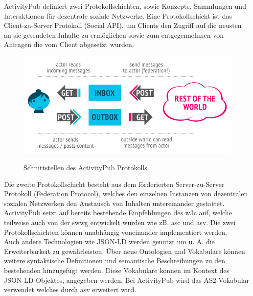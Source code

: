 {	ActivityPub definiert zwei Protokollschichten, sowie Konzepte, Sammlungen und Interaktionen für dezentrale soziale Netzwerke. Eine Protokollschicht ist das Client-zu-Server Protokoll (Social API), um Clients den Zugriff auf die neusten an sie gesendeten Inhalte zu ermöglichen sowie zum entgegennehmen von Anfragen die vom Client abgesetzt wurden\cite{activityPub}.\\ 
	
	\begin{figure}[h]
		\begin{minipage}{\textwidth}
			\centering
			\includegraphics[scale=0.55]{figures/client-server-federated.png}
			\label{fig:client-server-federated}
			\caption{Schnittstellen des ActivityPub Protokolls}
		\end{minipage}
	\end{figure}
	
	Die zweite Protokollschicht besteht aus dem förderierten Server-zu-Server Protokoll (Federation Protocol), welches den einzelnen Instanzen von dezentralen sozialen Netzwerken den Austausch von Inhalten untereinander gestattet. ActivityPub setzt auf bereits bestehende Empfehlungen des \gls{w3c} auf, welche teilweise auch von der \gls{swwg} entwickelt wurden wie zB. \gls{asc} und \gls{asv}\cite{activityPub}. Die zwei Protokollschichten können unabhängig voneinander implementiert werden.\\
	
	Auch andere Technologien wie \gls{JSON-LD} werden genutzt um u. A. die Erweiterbarkeit zu gewährleisten. Über neue Ontologien und Vokabulare können weitere syntaktische Definitionen und semantische Beschreibungen zu den bestehenden hinzugefügt werden\cite{activityPub}. Diese Vokabulare können im Kontext des \gls{JSON-LD} Objektes, angegeben werden. Bei ActivityPub wird das \gls{AS2} Vokabular verwendet welches durch \gls{asv} erweitert wird.
}
